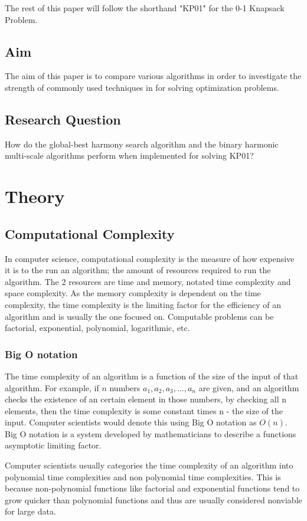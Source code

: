 \documentclass[titlepage]{article}
\begin{document}
The rest of this paper will follow the shorthand "KP01" for the 0-1 Knapsack Problem. 


\subsection{Aim}
The aim of this paper is to compare various algorithms in order to investigate the strength of commonly used techniques in for solving optimization problems.

\subsection{Research Question}
How do the global-best harmony search algorithm and the binary harmonic multi-scale algorithms perform when implemented for solving KP01?

\section{Theory}
\subsection{Computational Complexity}
In computer science, computational complexity is the measure of how expensive it is to the run an algorithm; the amount of resources required to run the algorithm. The 2 resources are time and memory, notated time complexity and space complexity. As the memory complexity is dependent on the time complexity, the time complexity is the limiting factor for the efficiency of an algorithm and is usually the one focused on. Computable problems can be factorial, exponential, polynomial, logarithmic, etc.

\subsubsection*{Big O notation}
The time complexity of an algorithm is a function of the size of the input of that algorithm. For example, if $n$ numbers $a_1, a_2, a_3, ..., a_n$ are given, and an algorithm checks the existence of an certain element in those numbers, by checking all n elements, then the time complexity is some constant times n - the size of the input. Computer scientists would denote this using Big O notation as $O(n)$. Big O notation is a system developed by mathematicians to describe a functions asymptotic limiting factor.

Computer scientists usually categories the time complexity of an algorithm into polynomial time complexities and non polynomial time complexities. This is because non-polynomial functions like factorial and exponential functions tend to grow quicker than polynomial functions and thus are usually considered nonviable for large data. 
\end{document}

